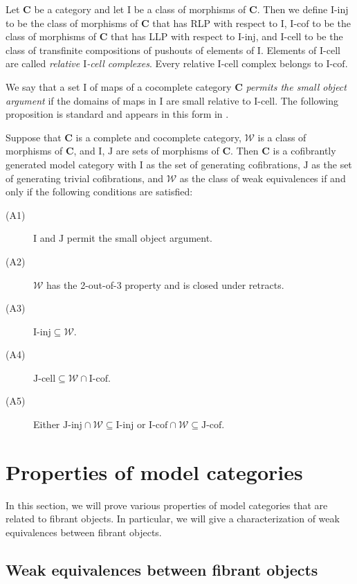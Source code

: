 \documentclass{tac}
\theoremstyle{definition}
\newcommand{\we}{\mathcal{W}}
\newcommand{\cat}[1]{\mathbf{#1}}
\newcommand{\C}{\cat{C}}
\newcommand{\I}{\mathrm{I}}
\newcommand{\J}{\mathrm{J}}
\newcommand{\class}[2]{#1\text{-}\mathrm{#2}}
\newcommand{\Iinj}[1][\I]{\class{#1}{inj}}
\newcommand{\Icell}[1][\I]{\class{#1}{cell}}
\newcommand{\Icof}[1][\I]{\class{#1}{cof}}
\newcommand{\Jinj}[1][]{\Iinj[\J#1]}
\newcommand{\Jcell}[1][]{\Icell[\J#1]}
\newcommand{\Jcof}[1][]{\Icof[\J#1]}
\begin{document}
Let $\C$ be a category and let $\I$ be a class of morphisms of $\C$.
Then we define $\Iinj$ to be the class of morphisms of $\C$ that has RLP with respect to $\I$,
$\Icof$ to be the class of morphisms of $\C$ that has LLP with respect to $\Iinj$, and
$\Icell$ to be the class of transfinite compositions of pushouts of elements of $\I$.
Elements of $\Icell$ are called \emph{relative $\I$-cell complexes}.
Every relative $\I$-cell complex belongs to $\Icof$.

We say that a set $\I$ of maps of a cocomplete category $\C$ \emph{permits the small object argument}
if the domains of maps in $\I$ are small relative to $\Icell$.
The following proposition is standard and appears in this form in \cite{hovey}.

\begin{prop}
Suppose that $\C$ is a complete and cocomplete category, $\we$ is a class of morphisms of $\C$, and $\I$, $\J$ are sets of morphisms of $\C$.
Then $\C$ is a cofibrantly generated model category with $\I$ as the set of generating cofibrations,
$\J$ as the set of generating trivial cofibrations, and $\we$ as the class of weak equivalences if and only if the following conditions are satisfied:
\begin{description}
\item[(A1)] $\I$ and $\J$ permit the small object argument.
\item[(A2)] $\we$ has the 2-out-of-3 property and is closed under retracts.
\item[(A3)] $\Iinj \subseteq \we$.
\item[(A4)] $\Jcell \subseteq \we \cap \Icof$.
\item[(A5)] Either $\Jinj \cap \we \subseteq \Iinj$ or $\Icof \cap \we \subseteq \Jcof$.
\end{description}
\end{prop}

\section{Properties of model categories}

In this section, we will prove various properties of model categories that are related to fibrant objects.
In particular, we will give a characterization of weak equivalences between fibrant objects.

\subsection{Weak equivalences between fibrant objects}
\end{document}
